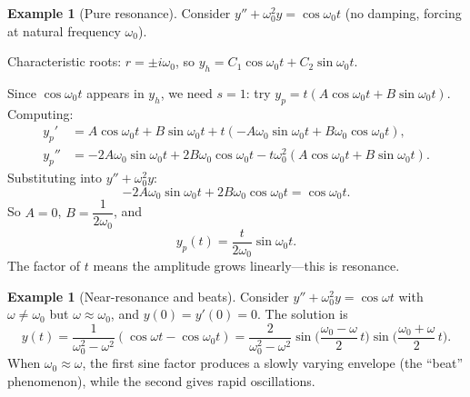 \documentclass[12pt,a4paper,openany]{book}
\theoremstyle{definition}
\newtheorem{example}[definition]{Example}
\theoremstyle{plain}
\theoremstyle{remark}
\begin{document}
\begin{example}[Pure resonance]\label{ex:resonance}
Consider $y'' + \omega_0^2 y = \cos\omega_0 t$ (no damping, forcing at
natural frequency $\omega_0$).

Characteristic roots: $r = \pm i\omega_0$, so
$y_h = C_1\cos\omega_0 t + C_2\sin\omega_0 t$.

Since $\cos\omega_0 t$ appears in $y_h$, we need $s = 1$: try
$y_p = t(A\cos\omega_0 t + B\sin\omega_0 t)$.
Computing:
\begin{align*}
  y_p'  &= A\cos\omega_0 t + B\sin\omega_0 t
           + t(-A\omega_0\sin\omega_0 t + B\omega_0\cos\omega_0 t), \\
  y_p'' &= -2A\omega_0\sin\omega_0 t + 2B\omega_0\cos\omega_0 t
           - t\omega_0^2(A\cos\omega_0 t + B\sin\omega_0 t).
\end{align*}
Substituting into $y'' + \omega_0^2 y$:
\[
  -2A\omega_0\sin\omega_0 t + 2B\omega_0\cos\omega_0 t = \cos\omega_0 t.
\]
So $A = 0$, $B = \dfrac{1}{2\omega_0}$, and
\[
  y_p(t) = \frac{t}{2\omega_0}\sin\omega_0 t.
\]
The factor of $t$ means the amplitude grows linearly---this is resonance.
\end{example}

\begin{center}
\end{center}

\begin{example}[Near-resonance and beats]\label{ex:beats}
Consider $y'' + \omega_0^2 y = \cos\omega t$ with $\omega \ne \omega_0$ but
$\omega \approx \omega_0$, and $y(0) = y'(0) = 0$. The solution is
\[
  y(t) = \frac{1}{\omega_0^2 - \omega^2}(\cos\omega t - \cos\omega_0 t)
  = \frac{2}{\omega_0^2 - \omega^2}
    \sin\!\biggl(\frac{\omega_0 - \omega}{2}\,t\biggr)
    \sin\!\biggl(\frac{\omega_0 + \omega}{2}\,t\biggr).
\]
When $\omega_0 \approx \omega$, the first sine factor produces a slowly varying
envelope (the ``beat'' phenomenon), while the second gives rapid oscillations.
\end{example}
\end{document}
